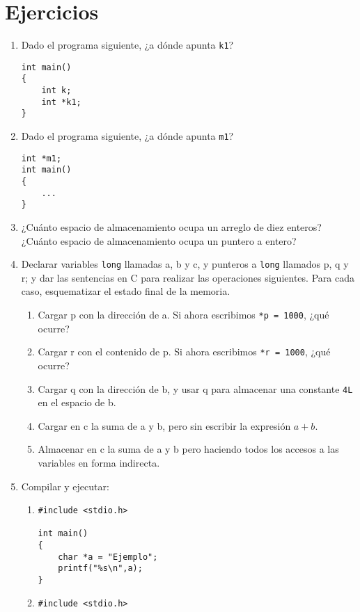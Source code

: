 \section{Ejercicios}
\label{sec:tc-direcciones-ej}
\begin{enumerate}
	\item Dado el programa siguiente, ¿a dónde apunta \texttt{k1}?
\begin{lstlisting}
int main()
{
    int k;
    int *k1;
}
\end{lstlisting}
	\item Dado el programa siguiente, ¿a dónde apunta \texttt{m1}?
\begin{lstlisting}
int *m1;
int main()
{
    ...
}	
\end{lstlisting}
	\item ¿Cuánto espacio de almacenamiento ocupa un arreglo de diez enteros? ¿Cuánto
espacio de almacenamiento ocupa un puntero a entero?
	\item Declarar variables \texttt{long} llamadas a, b y c, y punteros a \texttt{long} llamados p, q y r; y dar
las sentencias en C para realizar las operaciones siguientes. Para cada caso,
esquematizar el estado final de la memoria.
	\begin{enumerate}[label=\alph*.]
		\item Cargar p con la dirección de a. Si ahora escribimos \lstinline{*p = 1000}, ¿qué
      ocurre?
		\item Cargar r con el contenido de p. Si ahora escribimos \lstinline{*r = 1000}, ¿qué
      ocurre?
		\item Cargar q con la dirección de b, y usar q para almacenar una constante \texttt{4L}
      en el espacio de b.
		\item Cargar en c la suma de a y b, pero sin escribir la expresión $a+b$.
		\item Almacenar en c la suma de a y b pero haciendo todos los accesos a las
      variables en forma indirecta.
	\end{enumerate}
\item Compilar y ejecutar:
\begin{enumerate}[label=\alph*.]
		\item 
\begin{lstlisting}
#include <stdio.h>

int main()
{
    char *a = "Ejemplo";
    printf("%s\n",a);
}
\end{lstlisting}

\item 
\begin{lstlisting}
#include <stdio.h>


\end{lstlisting}
\end{enumerate}
\end{enumerate}
